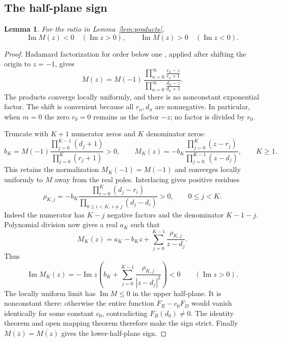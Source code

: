 \documentclass[11pt]{article}
\newtheorem{lemma}[theorem]{Lemma}
\DeclareMathOperator{\Impart}{Im}
\begin{document}
\subsection{The half-plane sign}

\begin{lemma}\label{lem:half-plane}
For the ratio in Lemma~\ref{lem:products},
\begin{equation}\label{eq:half-plane}
 \Impart M(z)<0\quad(\Impart z>0),\qquad
 \Impart M(z)>0\quad(\Impart z<0).
\end{equation}
\end{lemma}

\begin{proof}
Hadamard factorization for order below one
\cite[Theorem 5.15, p.~57]{M}, applied after shifting the origin to
$z=-1$, gives
\begin{equation}\label{eq:canonical}
 M(z)=M(-1)\,
 \frac{\displaystyle\prod_{n=0}^\infty\frac{r_n-z}{r_n+1}}
      {\displaystyle\prod_{n=0}^\infty\frac{d_n-z}{d_n+1}}.
\end{equation}
The products converge locally uniformly, and there is no nonconstant
exponential factor. The shift is convenient because all $r_n,d_n$ are
nonnegative. In particular, when $m=0$ the zero $r_0=0$ remains as the
factor $-z$; no factor is divided by $r_0$.

Truncate with $K+1$ numerator zeros and $K$ denominator zeros:
\[
 b_K=M(-1)\frac{\prod_{j=0}^{K-1}(d_j+1)}
                      {\prod_{j=0}^{K}(r_j+1)}>0,\qquad
 M_K(z)=-b_K\frac{\prod_{j=0}^{K}(z-r_j)}
                       {\prod_{j=0}^{K-1}(z-d_j)},\qquad K\geq1.
\]
This retains the normalization $M_K(-1)=M(-1)$ and converges locally
uniformly to $M$ away from the real poles. Interlacing gives positive
residues
\[
 \rho_{K,j}=-b_K
 \frac{\prod_{i=0}^{K}(d_j-r_i)}
      {\prod_{0\leq i<K,\ i\ne j}(d_j-d_i)}>0,
 \qquad 0\leq j<K.
\]
Indeed the numerator has $K-j$ negative factors and the denominator
$K-1-j$. Polynomial division now gives a real $a_K$ such that
\[
 M_K(z)=a_K-b_Kz+\sum_{j=0}^{K-1}\frac{\rho_{K,j}}{z-d_j}.
\]
Thus
\[
 \Impart M_K(z)=-\Impart z\left(b_K+
       \sum_{j=0}^{K-1}\frac{\rho_{K,j}}{|z-d_j|^2}\right)<0
 \qquad(\Impart z>0).
\]
The locally uniform limit has $\Impart M\leq0$ in the upper half-plane.
It is nonconstant there: otherwise the entire function
$F_R-c_0F_D$ would vanish identically for some constant $c_0$,
contradicting $F_R(d_0)\ne0$. The identity theorem and open mapping
theorem \cite[Theorems 3.44 and 4.24]{M} therefore make the sign strict.
Finally $M(\overline z)=\overline{M(z)}$ gives the lower-half-plane sign.
\end{proof}
\end{document}
